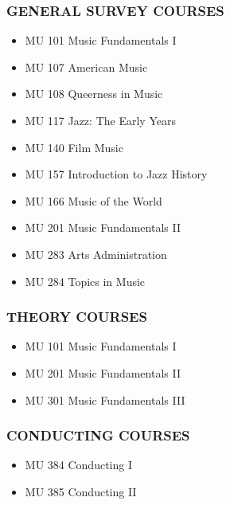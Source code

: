 \documentclass[
  letterpaper,
]{scrbook}
\providecommand{\tightlist}{%
  \setlength{\itemsep}{0pt}\setlength{\parskip}{0pt}}
\begin{document}
\subsubsection{GENERAL SURVEY COURSES}\label{general-survey-courses}

\begin{itemize}
\tightlist
\item
  MU 101 Music Fundamentals I\\
\item
  MU 107 American Music\\
\item
  MU 108 Queerness in Music\\
\item
  MU 117 Jazz: The Early Years\\
\item
  MU 140 Film Music\\
\item
  MU 157 Introduction to Jazz History\\
\item
  MU 166 Music of the World\\
\item
  MU 201 Music Fundamentals II\\
\item
  MU 283 Arts Administration\\
\item
  MU 284 Topics in Music
\end{itemize}

\subsubsection{THEORY COURSES}\label{theory-courses}

\begin{itemize}
\tightlist
\item
  MU 101 Music Fundamentals I\\
\item
  MU 201 Music Fundamentals II\\
\item
  MU 301 Music Fundamentals III
\end{itemize}

\subsubsection{CONDUCTING COURSES}\label{conducting-courses}

\begin{itemize}
\tightlist
\item
  MU 384 Conducting I\\
\item
  MU 385 Conducting II
\end{itemize}
\end{document}
